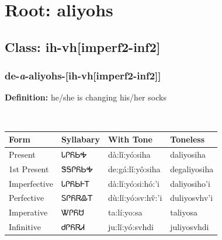 \needspace{4in}
\section*{Root: aliyohs}
\nopagebreak
{}
\needspace{3in}
\subsection*{Class: ih-vh[imperf2-inf2]}
\nopagebreak
\needspace{2in}
\subsubsection*{de{-}\textit{a}{-}\textbf{aliyohs}{-}[ih-vh[imperf2-inf2]]}
\nopagebreak
\textbf{Definition: } he/she is changing his/her socks
\\[0.5em]
\begin{tabularx}{\textwidth}{l X X X}%
\toprule%
\textbf{Form}&\textbf{Syllabary}&\textbf{With Tone}&\textbf{Toneless}\\%
\midrule%
Present&ᏓᎵᏲᏏᎭ&dà:lǐ:yó:siha&daliyosiha\\%
1st Present&ᏕᎦᎵᏲᏏᎭ&de:gá:lǐ:yô:siha&degaliyosiha\\%
Imperfective&ᏓᎵᏲᏏᎰᎢ&dà:lǐ:yó:si:hó:’i&daliyosiho’i\\%
Perfective&ᏚᎵᏲᏒᎲᎢ&dù:lǐ:yó:sv:hv̌:’i&duliyosvhv’i\\%
Imperative&ᏔᎵᏲᏌ&ta:lí:yo:sa&taliyosa\\%
Infinitive&ᏧᎵᏲᏒᏗ&ju:lǐ:yó:svhdi&juliyosvhdi\\%
\bottomrule%
\end{tabularx}
\\[1em]